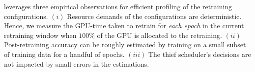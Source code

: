 

\name leverages three empirical observations for efficient profiling of the retraining configurations. 
$(i)$ Resource demands of the configurations are deterministic. Hence, we measure the GPU-time taken to retrain for {\em each epoch} in the current retraining window when $100\%$ of the GPU is allocated to the retraining. %
$(ii)$ Post-retraining accuracy can be roughly estimated by training on a small subset of training data for a handful of epochs.
$(iii)$ The thief scheduler's decisions are not impacted by small errors in the estimations.%



